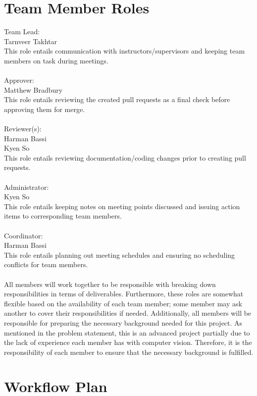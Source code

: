 \documentclass{article}
\begin{document}
\section{Team Member Roles}
\noindent Team Lead:\\
Tarnveer Takhtar\\
This role entails communication with instructors/supervisors and keeping team members on task during meetings.\\
\\
Approver:\\
Matthew Bradbury\\
This role entails reviewing the created pull requests as a final check before approving them for merge.\\
\\
Reviewer(s):\\
Harman Bassi\\
Kyen So\\
This role entails reviewing documentation/coding changes prior to creating pull requests.\\
\\
Administrator:\\
Kyen So\\
This role entails keeping notes on meeting points discussed and issuing action items to corresponding team members.\\
\\
Coordinator:\\
Harman Bassi\\
This role entails planning out meeting schedules and ensuring no scheduling conflicts for team members.\\
\\
All members will work together to be responsible with breaking down responsibilities in terms of deliverables. Furthermore, these roles are somewhat flexible based on the availability of each team member; some member may ask another to cover their responsibilities if needed.
Additionally, all members will be responsible for preparing the necessary background needed for this project. As mentioned in the problem statement, this is an advanced project partially due to the lack of experience each member has with computer vision. Therefore, it is the responsibility of each member to ensure that the necessary background is fulfilled.
\section{Workflow Plan}
\end{document}

